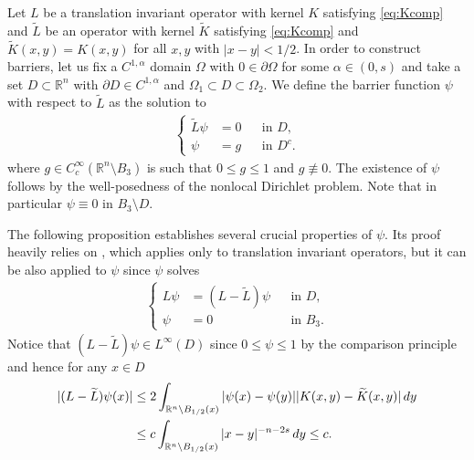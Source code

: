 \documentclass[11pt,reqno]{amsart}
\theoremstyle{plain}
\theoremstyle{definition}
\numberwithin{equation}{section}
\newcommand{\R}{\mathbb{R}}
\newcommand{\1}{\mathbbm{1}}
\renewcommand{\d}{\textnormal{\,d}}
\begin{document}
Let $L$ be a translation invariant operator with kernel $K$ satisfying \eqref{eq:Kcomp} and $\widetilde{L}$ be an operator with kernel $\widetilde{K}$ satisfying \eqref{eq:Kcomp} and $\widetilde{K}(x, y)=K(x, y)$ for all $x, y$ with $|x-y|<1/2$. In order to construct barriers, let us fix a $C^{1,\alpha}$ domain $\Omega$ with $0 \in \partial\Omega$ for some $\alpha \in (0,s)$ and take a set $D \subset \R^n$ with $\partial D \in C^{1,\alpha}$ and $\Omega_1 \subset D \subset \Omega_2$. We define the barrier function $\psi$ with respect to $\widetilde{L}$ as the solution to
\begin{align}
\label{eq:translation-invariant-solution}
\left\{
\begin{aligned}
    \widetilde{L}\psi&=0 &&\text{in } D, \\
    \psi&=g &&\text{in } D^c.
\end{aligned}
\right.
\end{align}
where $g \in C^{\infty}_c(\R^n \setminus B_3)$ is such that $0 \le g \le 1$ and $g \not\equiv 0$. The existence of $\psi$ follows by the well-posedness of the nonlocal Dirichlet problem.
Note that in particular $\psi \equiv 0$ in $B_3 \setminus D$.

The following proposition establishes several crucial properties of $\psi$. Its proof heavily relies on \cite[Theorem~6.9]{RoWe24}, which applies only to translation invariant operators, but it can be also applied to $\psi$ since $\psi$ solves
\begin{align}\label{eq-Lpsi}
    \left\{
    \begin{aligned}
        L\psi &= (L-\widetilde{L})\psi &&\text{in } D, \\
        \psi &= 0 &&\text{in } B_3.
    \end{aligned}
    \right.
\end{align}
Notice that $(L-\widetilde{L})\psi \in L^\infty(D)$ since $0\leq\psi\leq 1$ by the comparison principle and hence for any $x \in D$
\begin{align*}
\begin{split}
    |(L-\widetilde{L})\psi(x)|
    &\leq 2\int_{\R^n \setminus B_{1/2}(x)} |\psi(x)-\psi(y)| |K(x, y)-\widetilde{K}(x, y)| \d y \\
    &\leq c \int_{\R^n \setminus B_{1/2}(x)} |x-y|^{-n-2s} \d y \leq c.
\end{split}
\end{align*}
\end{document}
